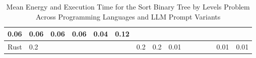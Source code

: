 \begin{table}[]
{\begin{tabular}{|l|lllllll|lllllll|}
  \multicolumn{1}{l|}{{\color[HTML]{666666} 0.06}} &
  \multicolumn{1}{l|}{{\color[HTML]{666666} 0.06}} &
  \multicolumn{1}{l|}{{\color[HTML]{666666} 0.06}} &
  \multicolumn{1}{l|}{{\color[HTML]{666666} 0.06}} &
  \multicolumn{1}{l|}{{\color[HTML]{666666} 0.04}} &
  {\color[HTML]{666666} 0.12} \\ \hline
{\color[HTML]{666666} Rust} &
  \multicolumn{1}{l|}{{\color[HTML]{666666} 0.2}} &
  \multicolumn{1}{l|}{} &
  \multicolumn{1}{l|}{} &
  \multicolumn{1}{l|}{} &
  \multicolumn{1}{l|}{} &
  \multicolumn{1}{l|}{{\color[HTML]{666666} 0.2}} &
  {\color[HTML]{666666} 0.2} &
  \multicolumn{1}{l|}{{\color[HTML]{666666} 0.01}} &
  \multicolumn{1}{l|}{} &
  \multicolumn{1}{l|}{} &
  \multicolumn{1}{l|}{} &
  \multicolumn{1}{l|}{} &
  \multicolumn{1}{l|}{{\color[HTML]{666666} 0.01}} &
  {\color[HTML]{666666} 0.01} \\ \hline
\end{tabular}%
}
\centering
\caption{Mean Energy and Execution Time for the Sort Binary Tree by Levels Problem Across Programming Languages and LLM Prompt Variants}
\end{table}